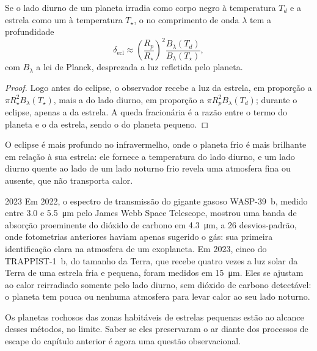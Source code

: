 \begin{proposition}\label{prop:b3:exoplanets:eclipse}
Se o lado diurno de um planeta irradia como corpo negro à temperatura
$T_d$ e a estrela como um à temperatura $T_\star$, o  no
comprimento de onda $\lambda$ tem a profundidade
\[
\delta_\mathrm{ecl} \approx \left(\frac{R_p}{R_\star}\right)^2
  \frac{B_\lambda(T_d)}{B_\lambda(T_\star)},
\]
com $B_\lambda$ a lei de Planck, desprezada a luz refletida pelo planeta.
\end{proposition}

\begin{proof}
Logo antes do eclipse, o observador recebe a luz da estrela, em proporção a
$\pi R_\star^2 B_\lambda(T_\star)$, mais a do lado diurno, em proporção a
$\pi R_p^2 B_\lambda(T_d)$; durante o eclipse, apenas a da estrela. A queda
fracionária é a razão entre o termo do planeta e o da estrela, sendo o do
planeta pequeno.
\end{proof}

O eclipse é mais profundo no infravermelho, onde o planeta frio é mais brilhante
em relação à sua estrela: ele fornece a temperatura do lado diurno, e um lado
diurno quente ao lado de um lado noturno frio revela uma atmosfera fina ou
ausente, que não transporta calor.

\begin{dated}{2023}
Em 2022, o espectro de transmissão do gigante gasoso WASP-39~b, medido
entre 3.0 e \qty{5.5}{\micro m} pelo James Webb Space Telescope,
mostrou uma banda de absorção proeminente do dióxido de carbono em
\qty{4.3}{\micro m}, a 26 desvios-padrão, onde fotometrias anteriores
haviam apenas sugerido o gás: sua primeira identificação clara na atmosfera
de um exoplaneta. Em 2023, cinco  do TRAPPIST-1~b, do
tamanho da Terra, que recebe quatro vezes a luz solar da Terra de uma
estrela fria e pequena, foram medidos em \qty{15}{\micro m}. Eles se ajustam
ao calor reirradiado somente pelo lado diurno, sem dióxido de carbono
detectável: o planeta tem pouca ou nenhuma atmosfera para levar calor ao seu
lado noturno.
\end{dated}

Os planetas rochosos das zonas habitáveis de estrelas pequenas estão ao alcance
desses métodos, no limite. Saber se eles preservaram o ar diante dos
processos de escape do capítulo anterior é agora uma
questão observacional.


